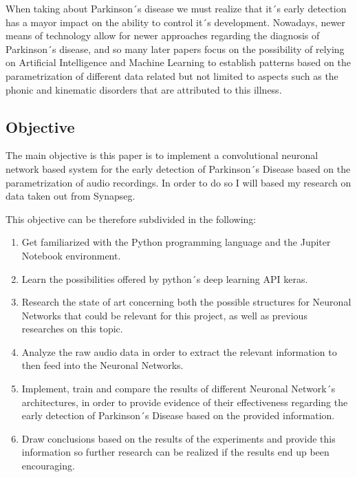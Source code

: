 \documentclass[12pt, a4paper]{article}
\begin{document}
	When taking about Parkinson´s disease we must realize that it´s early detection has a mayor impact on the ability to control it´s development. Nowadays, newer means of technology allow for newer approaches regarding the diagnosis of Parkinson´s disease, and so many later papers focus on the possibility of relying on Artificial Intelligence and Machine Learning to establish patterns based on the parametrization of different data related but not limited to aspects such as the phonic and kinematic disorders that are attributed to this illness. 
	
	
	
	

	\clearpage
		
	\subsection{Objective}
	
	The main objective is this paper is to implement a convolutional neuronal network based system for the early detection of Parkinson´s Disease based on the parametrization of audio recordings. In order to do so I will based my research on data taken out from Synapseg.
	
	This objective can be therefore subdivided in the following:
	
	\begin{enumerate}

		\item Get familiarized with the Python programming language and the Jupiter Notebook environment.
		
		\item Learn the possibilities offered by python´s deep learning API keras.
		
		\item Research the state of art concerning both the possible structures for Neuronal Networks that could be relevant for this project, as well as previous researches on this topic.
		
		\item Analyze the raw audio data in order to extract the relevant information to then feed into the Neuronal Networks.
		
		\item Implement, train and compare the results of different Neuronal Network´s architectures, in order to provide evidence of their effectiveness regarding the early detection of Parkinson´s Disease based on the provided information.
		
		\item Draw conclusions based on the results of the experiments and provide this information so further research can be realized if the results end up been encouraging.
		
	\end{enumerate}
\end{document}
